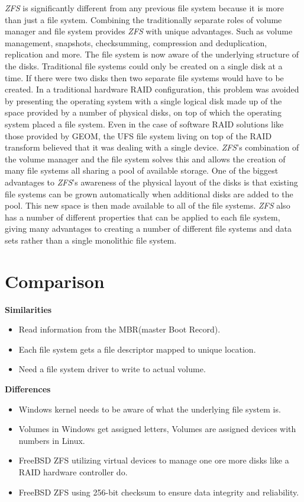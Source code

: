 \documentclass[10pt,draftclsnofoot,onecolumn,journal,compsoc]{IEEEtran}
\begin{document}
\textit{ZFS} is significantly different from any previous file system because it is more than just a file system. Combining the traditionally separate roles of volume manager and file system provides \textit{ZFS} with unique advantages. Such as volume management, snapshots, checksumming, compression and deduplication, replication and more. The file system is now aware of the underlying structure of the disks. Traditional file systems could only be created on a single disk at a time. If there were two disks then two separate file systems would have to be created. In a traditional hardware RAID configuration, this problem was avoided by presenting the operating system with a single logical disk made up of the space provided by a number of physical disks, on top of which the operating system placed a file system. Even in the case of software RAID solutions like those provided by GEOM, the UFS file system living on top of the RAID transform believed that it was dealing with a single device. \textit{ZFS}'s combination of the volume manager and the file system solves this and allows the creation of many file systems all sharing a pool of available storage. One of the biggest advantages to \textit{ZFS}'s awareness of the physical layout of the disks is that existing file systems can be grown automatically when additional disks are added to the pool. This new space is then made available to all of the file systems. \textit{ZFS} also has a number of different properties that can be applied to each file system, giving many advantages to creating a number of different file systems and data sets rather than a single monolithic file system. \cite{BSDhandbook}

\section*{Comparison}
\noindent \textbf{Similarities}\\
\begin{itemize}
    \item Read information from the MBR(master Boot Record).
    \item Each file system gets a file descriptor mapped to unique location.
    \item Need a file system driver to write to actual volume.
\end{itemize}
\noindent \textbf{Differences}\\
\begin{itemize}
    \item Windows kernel needs to be aware of what the underlying file system is.
    \item Volumes in Windows get assigned letters, Volumes are assigned devices with numbers in Linux.
    \item FreeBSD ZFS utilizing virtual devices to manage one ore more disks like a RAID hardware controller do.
    \item FreeBSD ZFS using 256-bit checksum to ensure data integrity and reliability. 
\end{itemize}

\newpage


\end{document}
